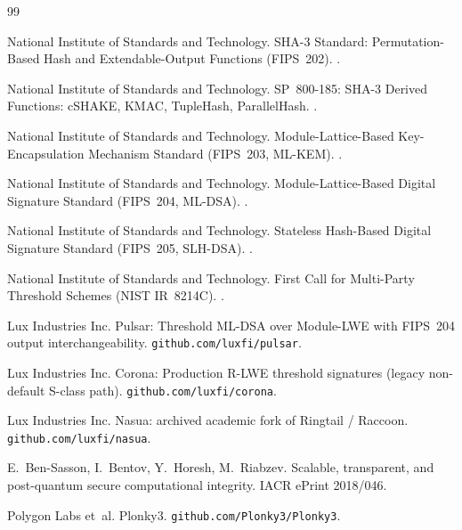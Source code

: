 \documentclass[11pt,a4paper]{article}
\begin{document}
\begin{thebibliography}{99}

National Institute of Standards and Technology.
\newblock SHA-3 Standard: Permutation-Based Hash and
Extendable-Output Functions (FIPS~202).
.

National Institute of Standards and Technology.
\newblock SP~800-185: SHA-3 Derived Functions: cSHAKE, KMAC,
TupleHash, ParallelHash.
.

National Institute of Standards and Technology.
\newblock Module-Lattice-Based Key-Encapsulation Mechanism
Standard (FIPS~203, ML-KEM).
.

National Institute of Standards and Technology.
\newblock Module-Lattice-Based Digital Signature Standard
(FIPS~204, ML-DSA).
.

National Institute of Standards and Technology.
\newblock Stateless Hash-Based Digital Signature Standard
(FIPS~205, SLH-DSA).
.

National Institute of Standards and Technology.
\newblock First Call for Multi-Party Threshold Schemes (NIST
IR~8214C).
.

Lux Industries Inc.
\newblock Pulsar: Threshold ML-DSA over Module-LWE with FIPS~204
output interchangeability.
\newblock \texttt{github.com/luxfi/pulsar}.

Lux Industries Inc.
\newblock Corona: Production R-LWE threshold signatures (legacy
non-default S-class path).
\newblock \texttt{github.com/luxfi/corona}.

Lux Industries Inc.
\newblock Nasua: archived academic fork of Ringtail / Raccoon.
\newblock \texttt{github.com/luxfi/nasua}.

E.~Ben-Sasson, I.~Bentov, Y.~Horesh, M.~Riabzev.
\newblock Scalable, transparent, and post-quantum secure
computational integrity.
\newblock IACR ePrint 2018/046.

Polygon Labs et~al.
\newblock Plonky3.
\newblock \texttt{github.com/Plonky3/Plonky3}.

\end{thebibliography}
\end{document}
